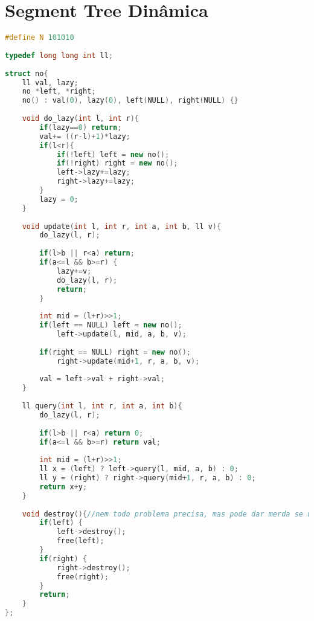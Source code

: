 \documentclass[12pt,a4paper,twoside]{report}
\begin{document}
\section{Segment Tree Dinâmica}
\noindent\begin{lstlisting}[caption=Segment Tree Dinâmica,language=C++]
#define N 101010
 
typedef long long int ll;
 
struct no{
    ll val, lazy;
    no *left, *right;
    no() : val(0), lazy(0), left(NULL), right(NULL) {}
     
    void do_lazy(int l, int r){
        if(lazy==0) return;
        val+= ((r-l)+1)*lazy;
        if(l<r){
            if(!left) left = new no();
            if(!right) right = new no();
            left->lazy+=lazy;
            right->lazy+=lazy;
        }
        lazy = 0;
    }
 
    void update(int l, int r, int a, int b, ll v){
        do_lazy(l, r);
         
        if(l>b || r<a) return;
        if(a<=l && b>=r) {
            lazy+=v;
            do_lazy(l, r);
            return;
        }
         
        int mid = (l+r)>>1;
        if(left == NULL) left = new no();
            left->update(l, mid, a, b, v);
         
        if(right == NULL) right = new no();
            right->update(mid+1, r, a, b, v);
             
        val = left->val + right->val;
    }
     
    ll query(int l, int r, int a, int b){
        do_lazy(l, r);
 
        if(l>b || r<a) return 0;
        if(a<=l && b>=r) return val;
         
        int mid = (l+r)>>1;
        ll x = (left) ? left->query(l, mid, a, b) : 0;
        ll y = (right) ? right->query(mid+1, r, a, b) : 0;
        return x+y;
    }
     
    void destroy(){//nem todo problema precisa, mas pode dar merda se nao destruir
        if(left) {
            left->destroy();
            free(left);
        }
        if(right) {
            right->destroy();
            free(right);
        }
        return;
    }
};
\end{lstlisting}
\end{document}
